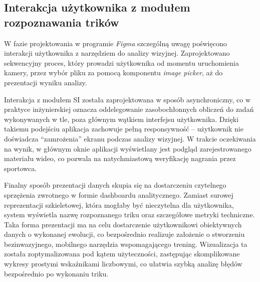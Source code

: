     \subsection{Interakcja użytkownika z modułem rozpoznawania trików}

        W fazie projektowania w programie \textit{Figma} szczególną uwagę poświęcono interakcji użytkownika z narzędziem do analizy wizyjnej. Zaprojektowano sekwencyjny proces, który prowadzi użytkownika od momentu uruchomienia kamery, przez wybór pliku za pomocą komponentu \textit{image picker}, aż do prezentacji wyniku analizy.

        Interakcja z modułem SI została zaprojektowana w sposób asynchroniczny, co w praktyce inżynierskiej oznacza oddelegowanie zasobochłonnych obliczeń do zadań wykonywanych w tle, poza głównym wątkiem interfejsu użytkownika. Dzięki takiemu podejściu aplikacja zachowuje pełną responsywność – użytkownik nie doświadcza \enquote{zamrożenia} ekranu podczas analizy wizyjnej. W trakcie oczekiwania na wynik, w głównym oknie aplikacji wyświetlany jest podgląd zarejestrowanego materiału wideo, co pozwala na natychmiastową weryfikację nagrania przez sportowca.

        Finalny sposób prezentacji danych skupia się na dostarczeniu czytelnego sprzężenia zwrotnego w formie dashboardu analitycznego. Zamiast surowej reprezentacji szkieletowej, która mogłaby być nieczytelna dla użytkownika, system wyświetla nazwę rozpoznanego triku oraz szczegółowe metryki techniczne. Taka forma prezentacji ma na celu dostarczenie użytkownikowi obiektywnych danych o wykonanej ewolucji, co bezpośrednio realizuje założenie o stworzeniu bezinwazyjnego, mobilnego narzędzia wspomagającego trening. Wizualizacja ta została zoptymalizowana pod kątem użyteczności, zastępując skomplikowane wykresy prostymi wskaźnikami liczbowymi, co ułatwia szybką analizę błędów bezpośrednio po wykonaniu triku.
